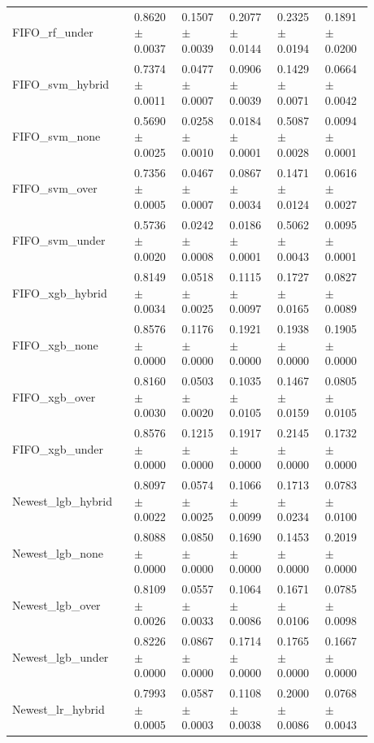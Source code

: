 \begin{longtable}{p{0.28\linewidth}p{0.12\linewidth}p{0.12\linewidth}p{0.12\linewidth}p{0.12\linewidth}p{0.12\linewidth}}
FIFO\_\allowbreak{}rf\_\allowbreak{}under & 0.8620\(\pm\)0.0037 & 0.1507\(\pm\)0.0039 & 0.2077\(\pm\)0.0144 & 0.2325\(\pm\)0.0194 & 0.1891\(\pm\)0.0200 \\
FIFO\_\allowbreak{}svm\_\allowbreak{}hybrid & 0.7374\(\pm\)0.0011 & 0.0477\(\pm\)0.0007 & 0.0906\(\pm\)0.0039 & 0.1429\(\pm\)0.0071 & 0.0664\(\pm\)0.0042 \\
FIFO\_\allowbreak{}svm\_\allowbreak{}none & 0.5690\(\pm\)0.0025 & 0.0258\(\pm\)0.0010 & 0.0184\(\pm\)0.0001 & 0.5087\(\pm\)0.0028 & 0.0094\(\pm\)0.0001 \\
FIFO\_\allowbreak{}svm\_\allowbreak{}over & 0.7356\(\pm\)0.0005 & 0.0467\(\pm\)0.0007 & 0.0867\(\pm\)0.0034 & 0.1471\(\pm\)0.0124 & 0.0616\(\pm\)0.0027 \\
FIFO\_\allowbreak{}svm\_\allowbreak{}under & 0.5736\(\pm\)0.0020 & 0.0242\(\pm\)0.0008 & 0.0186\(\pm\)0.0001 & 0.5062\(\pm\)0.0043 & 0.0095\(\pm\)0.0001 \\
FIFO\_\allowbreak{}xgb\_\allowbreak{}hybrid & 0.8149\(\pm\)0.0034 & 0.0518\(\pm\)0.0025 & 0.1115\(\pm\)0.0097 & 0.1727\(\pm\)0.0165 & 0.0827\(\pm\)0.0089 \\
FIFO\_\allowbreak{}xgb\_\allowbreak{}none & 0.8576\(\pm\)0.0000 & 0.1176\(\pm\)0.0000 & 0.1921\(\pm\)0.0000 & 0.1938\(\pm\)0.0000 & 0.1905\(\pm\)0.0000 \\
FIFO\_\allowbreak{}xgb\_\allowbreak{}over & 0.8160\(\pm\)0.0030 & 0.0503\(\pm\)0.0020 & 0.1035\(\pm\)0.0105 & 0.1467\(\pm\)0.0159 & 0.0805\(\pm\)0.0105 \\
FIFO\_\allowbreak{}xgb\_\allowbreak{}under & 0.8576\(\pm\)0.0000 & 0.1215\(\pm\)0.0000 & 0.1917\(\pm\)0.0000 & 0.2145\(\pm\)0.0000 & 0.1732\(\pm\)0.0000 \\
Newest\_\allowbreak{}lgb\_\allowbreak{}hybrid & 0.8097\(\pm\)0.0022 & 0.0574\(\pm\)0.0025 & 0.1066\(\pm\)0.0099 & 0.1713\(\pm\)0.0234 & 0.0783\(\pm\)0.0100 \\
Newest\_\allowbreak{}lgb\_\allowbreak{}none & 0.8088\(\pm\)0.0000 & 0.0850\(\pm\)0.0000 & 0.1690\(\pm\)0.0000 & 0.1453\(\pm\)0.0000 & 0.2019\(\pm\)0.0000 \\
Newest\_\allowbreak{}lgb\_\allowbreak{}over & 0.8109\(\pm\)0.0026 & 0.0557\(\pm\)0.0033 & 0.1064\(\pm\)0.0086 & 0.1671\(\pm\)0.0106 & 0.0785\(\pm\)0.0098 \\
Newest\_\allowbreak{}lgb\_\allowbreak{}under & 0.8226\(\pm\)0.0000 & 0.0867\(\pm\)0.0000 & 0.1714\(\pm\)0.0000 & 0.1765\(\pm\)0.0000 & 0.1667\(\pm\)0.0000 \\
Newest\_\allowbreak{}lr\_\allowbreak{}hybrid & 0.7993\(\pm\)0.0005 & 0.0587\(\pm\)0.0003 & 0.1108\(\pm\)0.0038 & 0.2000\(\pm\)0.0086 & 0.0768\(\pm\)0.0043 \\

\end{longtable}
